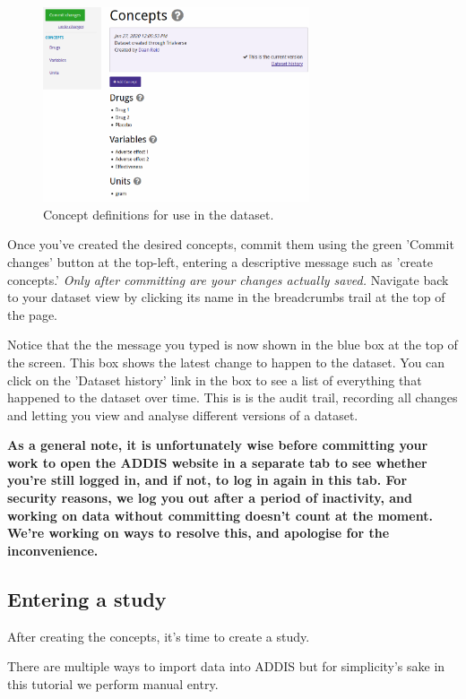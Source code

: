 \documentclass[12pt]{article}
\begin{document}
\begin{figure}[!ht]
  \centering
  \includegraphics[width=0.7\textwidth]{img/concepts.png}
  \caption{Concept definitions for use in the dataset.}
\label{fig:concepts}
\end{figure}

Once you've created the desired concepts, commit them using the green 'Commit changes' button at the top-left, entering a descriptive message such as 'create concepts.'
\textit{Only after committing are your changes actually saved.}
Navigate back to your dataset view by clicking its name in the breadcrumbs trail at the top of the page. 

Notice that the the message you typed is now shown in the blue box at the top of the screen.
This box shows the latest change to happen to the dataset.
You can click on the 'Dataset history' link in the box to see a list of everything that happened to the dataset over time.
This is is the audit trail, recording all changes and letting you view and analyse different versions of a dataset.


\textbf{As a general note, it is unfortunately wise before committing your work to open the ADDIS website in a separate tab to see whether you're still logged in, and if not, to log in again in this tab.
For security reasons, we log you out after a period of inactivity, and working on data without committing doesn't count at the moment.
We're working on ways to resolve this, and apologise for the inconvenience.}

\subsection{Entering a study}

After creating the concepts, it's time to create a study.

There are multiple ways to import data into ADDIS but for simplicity's sake in this tutorial we perform manual entry.
\end{document}
